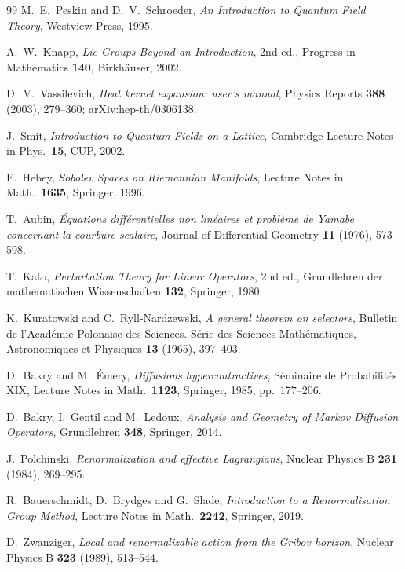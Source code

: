 \documentclass[11pt,a4paper]{amsart}
\theoremstyle{definition}
\begin{document}
\begin{thebibliography}{99}
M.~E.~Peskin and D.~V.~Schroeder,
\emph{An Introduction to Quantum Field Theory},
Westview Press, 1995.

A.~W.~Knapp,
\emph{Lie Groups Beyond an Introduction},
2nd ed., Progress in Mathematics \textbf{140}, Birkh\"auser, 2002.

D.~V.~Vassilevich,
\emph{Heat kernel expansion: user's manual},
Physics Reports \textbf{388} (2003), 279--360; arXiv:hep-th/0306138.

J.~Smit,
\emph{Introduction to Quantum Fields on a Lattice},
Cambridge Lecture Notes in Phys.\ \textbf{15}, CUP, 2002.

E.~Hebey,
\emph{Sobolev Spaces on Riemannian Manifolds},
Lecture Notes in Math.\ \textbf{1635}, Springer, 1996.

T.~Aubin,
\emph{\'Equations diff\'erentielles non lin\'eaires et probl\`eme de Yamabe
concernant la courbure scalaire},
Journal of Differential Geometry \textbf{11} (1976), 573--598.

T.~Kato,
\emph{Perturbation Theory for Linear Operators},
2nd ed., Grundlehren der mathematischen Wissenschaften \textbf{132}, Springer, 1980.

K.~Kuratowski and C.~Ryll-Nardzewski,
\emph{A general theorem on selectors},
Bulletin de l'Acad\'emie Polonaise des Sciences. S\'erie des Sciences Math\'ematiques, Astronomiques et Physiques
\textbf{13} (1965), 397--403.

D.~Bakry and M.~\'Emery,
\emph{Diffusions hypercontractives},
S\'eminaire de Probabilit\'es XIX, Lecture Notes in Math.\ \textbf{1123},
Springer, 1985, pp.~177--206.

D.~Bakry, I.~Gentil and M.~Ledoux,
\emph{Analysis and Geometry of Markov Diffusion Operators},
Grundlehren \textbf{348}, Springer, 2014.

J.~Polchinski,
\emph{Renormalization and effective Lagrangians},
Nuclear Physics B \textbf{231} (1984), 269--295.

R.~Bauerschmidt, D.~Brydges and G.~Slade,
\emph{Introduction to a Renormalisation Group Method},
Lecture Notes in Math.\ \textbf{2242}, Springer, 2019.

D.~Zwanziger,
\emph{Local and renormalizable action from the Gribov horizon},
Nuclear Physics B \textbf{323} (1989), 513--544.

\end{thebibliography}
\end{document}
